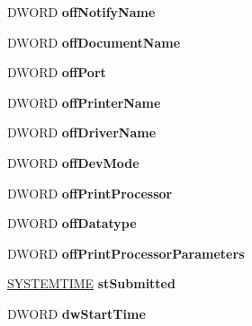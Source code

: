 \begin{DoxyCompactItemize}
D\+W\+O\+RD {\bfseries off\+Notify\+Name}
\item 
\mbox{\label{struct___s_h_d___h_e_a_d_e_r_a4f8f43f1e28dcdcbb6a9cc3df67c3e5a}} 
D\+W\+O\+RD {\bfseries off\+Document\+Name}
\item 
\mbox{\label{struct___s_h_d___h_e_a_d_e_r_a299737fb139f146827bafc22a36da92d}} 
D\+W\+O\+RD {\bfseries off\+Port}
\item 
\mbox{\label{struct___s_h_d___h_e_a_d_e_r_a8b8be5436dc510c21549c99964f96f1a}} 
D\+W\+O\+RD {\bfseries off\+Printer\+Name}
\item 
\mbox{\label{struct___s_h_d___h_e_a_d_e_r_a595586f32a607968a87041a0baef0f6f}} 
D\+W\+O\+RD {\bfseries off\+Driver\+Name}
\item 
\mbox{\label{struct___s_h_d___h_e_a_d_e_r_ab95bb9d986953929ea8cf46978e59880}} 
D\+W\+O\+RD {\bfseries off\+Dev\+Mode}
\item 
\mbox{\label{struct___s_h_d___h_e_a_d_e_r_a8e3a3f94b56c7e911a782d3097b3b703}} 
D\+W\+O\+RD {\bfseries off\+Print\+Processor}
\item 
\mbox{\label{struct___s_h_d___h_e_a_d_e_r_a5d17ef972db3a7b079cb8b27cb1b2617}} 
D\+W\+O\+RD {\bfseries off\+Datatype}
\item 
\mbox{\label{struct___s_h_d___h_e_a_d_e_r_aa5fadc7a4ecf63c81e8527ed6793ddd6}} 
D\+W\+O\+RD {\bfseries off\+Print\+Processor\+Parameters}
\item 
\mbox{\label{struct___s_h_d___h_e_a_d_e_r_ac3c78f211b7771848f9bbe8ff9809503}} 
\hyperlink{struct___s_y_s_t_e_m_t_i_m_e}{S\+Y\+S\+T\+E\+M\+T\+I\+ME} {\bfseries st\+Submitted}
\item 
\mbox{\label{struct___s_h_d___h_e_a_d_e_r_ac193cc766a53fe44a87285485458b767}} 
D\+W\+O\+RD {\bfseries dw\+Start\+Time}
\item 
\mbox{\label{struct___s_h_d___h_e_a_d_e_r_abf8ce5edfc9ce4f9879412a11340bf8e}} 

\end{DoxyCompactItemize}
